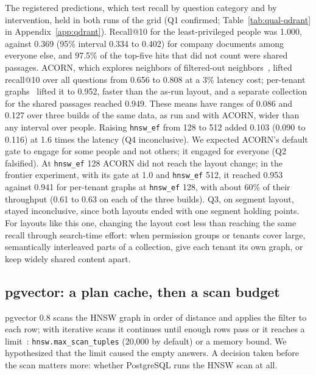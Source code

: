 The registered predictions, which test recall by question category and by intervention, held in both runs of the grid (Q1 confirmed; Table~\ref{tab:qual-qdrant} in
Appendix~\ref{app:qdrant}). Recall@10 for the least-privileged people was 1.000, against 0.369 (95\% interval 0.334 to 0.402) for
company documents among everyone else, and 97.5\% of the top-five hits that did not count were shared passages. ACORN, which explores
neighbors of filtered-out neighbors~\cite{patel2024acorn}, lifted recall@10 over all questions from 0.656 to 0.808 at a 3\% latency
cost; per-tenant graphs~\cite{qdrant2026multitenancy} lifted it to 0.952, faster than the as-run layout, and a separate collection for the
shared passages reached 0.949. These means have ranges of 0.086 and 0.127 over three builds of the same data, as run and with ACORN, wider than any interval over people. Raising \texttt{hnsw\_ef} from 128 to 512 added 0.103 (0.090 to 0.116) at 1.6 times the latency (Q4
inconclusive). We expected ACORN's default gate to engage for some people and not others; it engaged for everyone (Q2 falsified). At \texttt{hnsw\_ef} 128 ACORN did not reach the layout change; in the frontier experiment, with its gate at 1.0 and \texttt{hnsw\_ef} 512, it reached 0.953 against 0.941 for per-tenant graphs at \texttt{hnsw\_ef} 128, with about 60\% of their throughput (0.61 to 0.63 on each of the three builds). Q3, on segment layout, stayed inconclusive, since both layouts ended with one segment
holding points. For layouts like this one, changing the layout cost less than reaching the same recall through search-time effort: when
permission groups or tenants cover large, semantically interleaved parts of a collection, give each tenant its own graph, or keep
widely shared content apart.

\subsection{pgvector: a plan cache, then a scan budget}\label{sec:qual-pgvector}

pgvector 0.8 scans the HNSW graph in order of distance and applies the filter to each row; with iterative scans it continues until
enough rows pass or it reaches a limit~\cite{pgvector2026pgvector}: \texttt{hnsw.max\_scan\_tuples} (20,000 by default) or a
memory bound. We hypothesized that the limit caused the empty answers. A decision taken before the scan matters more: whether PostgreSQL
runs the HNSW scan at all.

